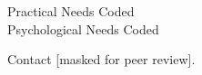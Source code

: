 \faSquareO \vspace{1em} Practical Needs Coded\\
\faSquareO \vspace{1em} Psychological Needs Coded



\divider

\divider

\divider

\divider

\divider

\divider

\divider

\divider






Contact [masked for peer review].

